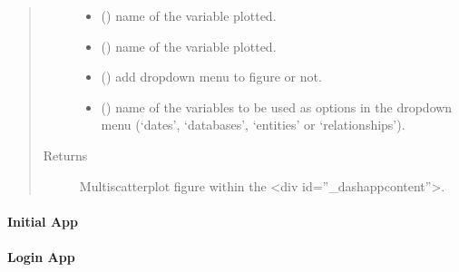 \documentclass[letterpaper,10pt,english]{sphinxmanual}
\begin{document}
\begin{fulllineitems}
\begin{quote}
\begin{description}
\begin{itemize}
\item {} 
 () \textendash{} name of the variable plotted.

\item {} 
 () \textendash{} name of the variable plotted.

\item {} 
 () \textendash{} add dropdown menu to figure or not.

\item {} 
 () \textendash{} name of the variables to be used as options in the dropdown menu (‘dates’,                         ‘databases’, ‘entities’ or ‘relationships’).

\end{itemize}

\item[{Returns}] \leavevmode
Multi\sphinxhyphen{}scatterplot figure within the \textless{}div id=”\_dash\sphinxhyphen{}app\sphinxhyphen{}content”\textgreater{}.

\end{description}\end{quote}

\end{fulllineitems}



\paragraph{Initial App}
\label{\detokenize{_autosummary/report_manager.apps:module-report_manager.apps.initialApp}}\label{\detokenize{_autosummary/report_manager.apps:initial-app}}

\paragraph{Login App}
\label{\detokenize{_autosummary/report_manager.apps:login-app}}
\end{document}
